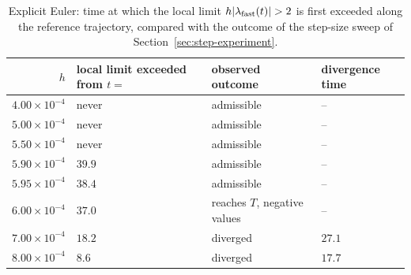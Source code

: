 \begin{table}[H]
\centering
\caption{Explicit Euler: time at which the local limit $h|\lambda_{\rm fast}(t)|>2$ is first exceeded along the reference trajectory, compared with the outcome of the step-size sweep of Section~\ref{sec:step-experiment}.}
\label{tab:hlambda}
\small
\begin{tabular}{rlll}
\toprule
$h$ & local limit exceeded from $t=$ & observed outcome & divergence time\\
\midrule
$4.00\times10^{-4}$ & never & admissible & --\\
$5.00\times10^{-4}$ & never & admissible & --\\
$5.50\times10^{-4}$ & never & admissible & --\\
$5.90\times10^{-4}$ & $39.9$ & admissible & --\\
$5.95\times10^{-4}$ & $38.4$ & admissible & --\\
$6.00\times10^{-4}$ & $37.0$ & reaches $T$, negative values & --\\
$7.00\times10^{-4}$ & $18.2$ & diverged & $27.1$\\
$8.00\times10^{-4}$ & $8.6$ & diverged & $17.7$\\
\bottomrule
\end{tabular}
\end{table}
